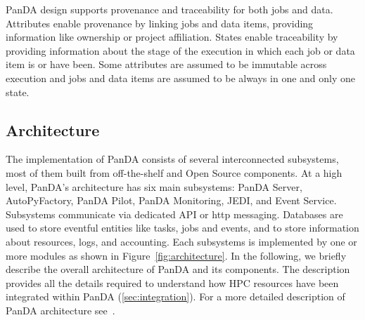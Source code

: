 PanDA design supports provenance and traceability for both jobs and data.
Attributes enable provenance by linking jobs and data items, providing
information like ownership or project affiliation. States enable traceability by
providing information about the stage of the execution in which each job or data
item is or have been. Some attributes are assumed to be immutable across
execution and jobs and data items are assumed to be always in one and only one
state.


\subsection{Architecture}
\label{ssec:panda_arch}

The implementation of PanDA consists of several interconnected subsystems, most
of them built from off-the-shelf and Open Source components. At a high level,
PanDA's architecture has six main subsystems: PanDA Server, AutoPyFactory, PanDA
Pilot, PanDA Monitoring, JEDI, and Event Service. Subsystems communicate via
dedicated API or http messaging. Databases are used to store eventful entities
like tasks, jobs and events, and to store information about resources, logs, and
accounting. Each subsystems is implemented by one or more modules as shown in
Figure~\ref{fig:architecture}. In the following, we briefly describe the overall
architecture of PanDA and its components. The description provides all the
details required to understand how HPC resources have been integrated within
PanDA (\ref{sec:integration}). For a more detailed description of PanDA
architecture see~\cite{wiki, papers}.

